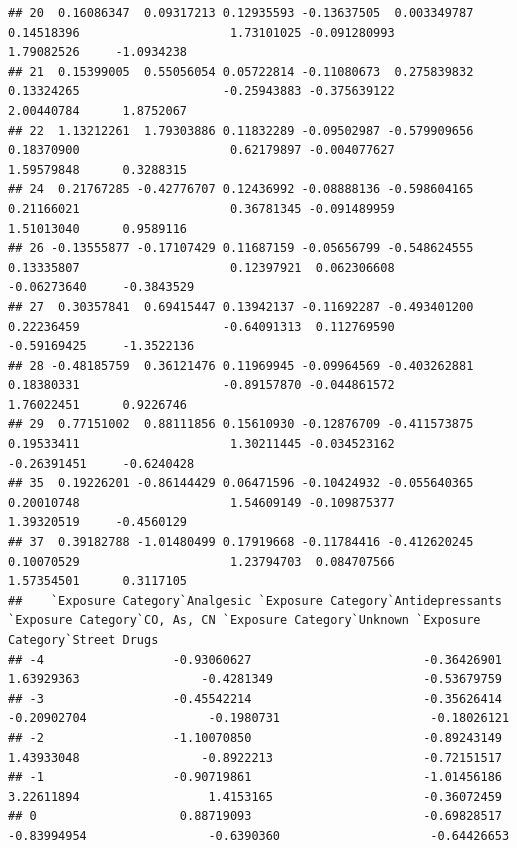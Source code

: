 \documentclass[
]{article}
\begin{document}
\begin{verbatim}
## 20  0.16086347  0.09317213 0.12935593 -0.13637505  0.003349787  0.14518396                     1.73101025 -0.091280993                              1.79082526     -1.0934238
## 21  0.15399005  0.55056054 0.05722814 -0.11080673  0.275839832  0.13324265                    -0.25943883 -0.375639122                              2.00440784      1.8752067
## 22  1.13212261  1.79303886 0.11832289 -0.09502987 -0.579909656  0.18370900                     0.62179897 -0.004077627                              1.59579848      0.3288315
## 24  0.21767285 -0.42776707 0.12436992 -0.08888136 -0.598604165  0.21166021                     0.36781345 -0.091489959                              1.51013040      0.9589116
## 26 -0.13555877 -0.17107429 0.11687159 -0.05656799 -0.548624555  0.13335807                     0.12397921  0.062306608                             -0.06273640     -0.3843529
## 27  0.30357841  0.69415447 0.13942137 -0.11692287 -0.493401200  0.22236459                    -0.64091313  0.112769590                             -0.59169425     -1.3522136
## 28 -0.48185759  0.36121476 0.11969945 -0.09964569 -0.403262881  0.18380331                    -0.89157870 -0.044861572                              1.76022451      0.9226746
## 29  0.77151002  0.88111856 0.15610930 -0.12876709 -0.411573875  0.19533411                     1.30211445 -0.034523162                             -0.26391451     -0.6240428
## 35  0.19226201 -0.86144429 0.06471596 -0.10424932 -0.055640365  0.20010748                     1.54609149 -0.109875377                              1.39320519     -0.4560129
## 37  0.39182788 -1.01480499 0.17919668 -0.11784416 -0.412620245  0.10070529                     1.23794703  0.084707566                              1.57354501      0.3117105
##    `Exposure Category`Analgesic `Exposure Category`Antidepressants `Exposure Category`CO, As, CN `Exposure Category`Unknown `Exposure Category`Street Drugs
## -4                  -0.93060627                        -0.36426901                    1.63929363                 -0.4281349                     -0.53679759
## -3                  -0.45542214                        -0.35626414                   -0.20902704                 -0.1980731                     -0.18026121
## -2                  -1.10070850                        -0.89243149                    1.43933048                 -0.8922213                     -0.72151517
## -1                  -0.90719861                        -1.01456186                    3.22611894                  1.4153165                     -0.36072459
## 0                    0.88719093                        -0.69828517                   -0.83994954                 -0.6390360                     -0.64426653

\end{verbatim}
\end{document}
